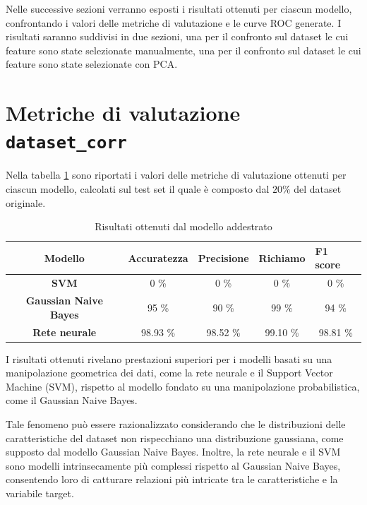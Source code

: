 Nelle successive sezioni verranno esposti i risultati ottenuti per ciascun
modello, confrontando i valori delle metriche di valutazione e le curve ROC
generate. I risultati saranno suddivisi in due sezioni, una per il confronto
sul dataset le cui feature sono state selezionate manualmente, una per il
confronto sul dataset le cui feature sono state selezionate con PCA.
\section{Metriche di valutazione \texttt{dataset\_corr}} \label{sec:metriche}
Nella tabella \ref{tab:risultati} sono riportati i valori delle metriche di
valutazione ottenuti per ciascun modello, calcolati sul test set il quale è
composto dal $20\%$ del dataset originale.
\begin{table}[!ht]
    \centering
    \begin{tabular}{@{}cllll@{}}
        \toprule
        \rowcolor[HTML]{EFEFEF}
        \textbf{Modello}                                      & \textbf{Accuratezza}         & \textbf{Precisione}          & \textbf{Richiamo}            & \textbf{F1 score}            \\ \midrule
        \cellcolor[HTML]{EFEFEF}\textbf{SVM}                  & \multicolumn{1}{c}{0 \%}     & \multicolumn{1}{c}{0 \%}     & \multicolumn{1}{c}{0 \%}     & \multicolumn{1}{c}{0 \%}     \\
        \cellcolor[HTML]{EFEFEF}\textbf{Gaussian Naive Bayes} & \multicolumn{1}{c}{95 \%}    & \multicolumn{1}{c}{90 \%}    & \multicolumn{1}{c}{99 \%}    & \multicolumn{1}{c}{94 \%}    \\
        \cellcolor[HTML]{EFEFEF}\textbf{Rete neurale}         & \multicolumn{1}{c}{98.93 \%} & \multicolumn{1}{c}{98.52 \%} & \multicolumn{1}{c}{99.10 \%} & \multicolumn{1}{c}{98.81 \%} \\ \bottomrule
    \end{tabular}
    \caption{Risultati ottenuti dal modello addestrato}
    \label{tab:risultati}
\end{table}

I risultati ottenuti rivelano prestazioni superiori per i modelli basati su una
manipolazione geometrica dei dati, come la rete neurale e il Support Vector
Machine (SVM), rispetto al modello fondato su una manipolazione probabilistica,
come il Gaussian Naive Bayes.

Tale fenomeno può essere razionalizzato considerando che le distribuzioni delle
caratteristiche del dataset non rispecchiano una distribuzione gaussiana, come
supposto dal modello Gaussian Naive Bayes. Inoltre, la rete neurale e il SVM
sono modelli intrinsecamente più complessi rispetto al Gaussian Naive Bayes,
consentendo loro di catturare relazioni più intricate tra le caratteristiche e
la variabile target.

